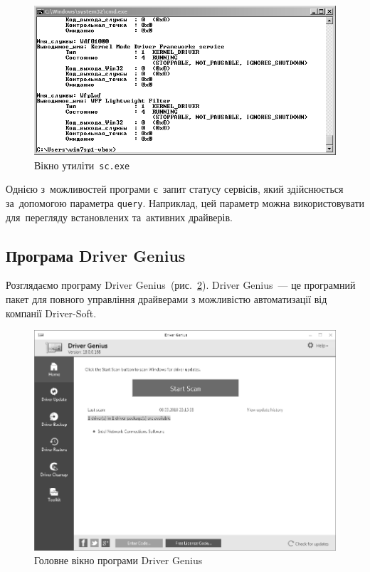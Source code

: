 \documentclass[
	a4paper,
	oneside,
	DIV = 12,
	BCOR = 10mm,
	12pt,
	headings = normal,
]{scrartcl}
\newcommand{\progname}[1]{\texttt{#1}}
\begin{document}
			\begin{figure}[!htb]
				\centering
				\includegraphics[height = 6\baselineskip]{./assets/y03s01-syssoft-lab-01-scr-04-scexe-bw.png}
				\caption{Вікно утиліти~\progname{sc.exe}}
				\label{fig:04-scexe}
			\end{figure}
			
			Однією з~можливостей програми є~запит статусу сервісів, який здійснюється за~допомогою параметра \texttt{query}. Наприклад, цей параметр можна використовувати для~перегляду встановлених та~активних драйверів.

		\subsection{Програма Driver Genius}
			Розглядаємо програму Driver Genius~(рис.~\ref{fig:05-driver-genius}). Driver Genius~— це програмний пакет для повного управління драйверами з можливістю автоматизації від компанії Driver-Soft.

			\begin{figure}[!htbp]
				\centering
				\includegraphics[height = 12\baselineskip]{./assets/y03s01-syssoft-lab-01-scr-05-drivergenius-bw.png}
				\caption{Головне вікно програми Driver Genius}
				\label{fig:05-driver-genius}
			\end{figure}
\end{document}
